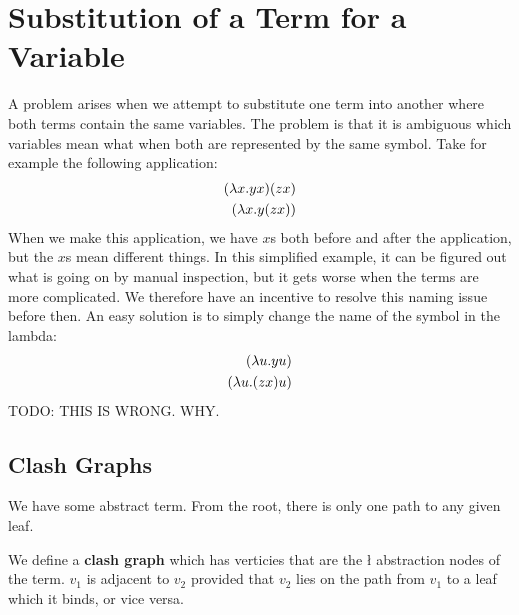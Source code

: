 \section{Substitution of a Term for a Variable}
A problem arises when we attempt to substitute one term into another where both terms contain the same variables. The problem is that it is ambiguous which variables mean what when both are represented by the same symbol. Take for example the following application:
\begin{eqnarray*}
  (\lambda x . yx)(zx)\\
  (\lambda x . y(zx))\\
\end{eqnarray*}
When we make this application, we have $x$s both before and after the application, but the $x$s mean different things. In this simplified example, it can be figured out what is going on by manual inspection, but it gets worse when the terms are more complicated. We therefore have an incentive to resolve this naming issue before then. An easy solution is to simply change the name of the symbol in the lambda:
\begin{eqnarray*}
  (\lambda u . yu)\\
  (\lambda u . (zx)u)
\end{eqnarray*}
TODO: THIS IS WRONG. WHY.

\subsection{Clash Graphs}
We have some abstract term. From the root, there is only one path to any given leaf.
\begin{center}
\end{center}

We define a \textbf{clash graph} which has verticies that are the \l{} abstraction nodes of the term. $v_1$ is adjacent to $v_2$ provided that $v_2$ lies on the path from $v_1$ to a leaf which it binds, or vice versa.
